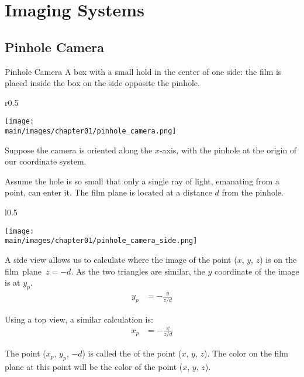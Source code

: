 \documentclass[../COS3712_Notes.tex]{subfiles}
\begin{document}
    \section{Imaging Systems}
      \subsection{Pinhole Camera}
        \begin{definition}{Pinhole Camera}
          A box with a small hold in the center of one side:
          the film is placed inside the box on the side opposite the pinhole.
        \end{definition}
        \begin{example}
          \begin{wrapfigure}[7]{r}{0.5\textwidth}
            \begin{center}
              \texttt{[image: \\main/images/chapter01/pinhole\_camera.png]}
            \end{center}
            \caption{Pinhole Camera}
          \end{wrapfigure}

          Suppose the camera is oriented along the \mbox{$x$-axis},
          with the pinhole at the origin of our coordinate system.

          Assume the hole is so small that only a single ray of light,
          emanating from a point, can enter it.
          The film plane is located at a distance $d$ from the pinhole.

          \vspace{7em}
          \pagebreak

          \begin{wrapfigure}[11]{l}{0.5\textwidth}
            \vspace{-20pt}
            \begin{center}
              \texttt{[image: \\main/images/chapter01/pinhole\_camera\_side.png]}
            \end{center}
            \vspace{-10pt}
            \caption{Pinhole Camera Side View}
          \end{wrapfigure}

          A side view allows us to calculate where the image of the point ($x$, $y$, $z$) is
          on the film~plane~$z = -d$.
          As the two triangles are similar, the $y$ coordinate of the image is at $y_p$.
          \begin{align*}
            y_p &= -\frac{y}{z/d}
          \end{align*}

          Using a top view, a similar calculation is:
          \begin{align*}
            x_p &= -\frac{x}{z/d}
          \end{align*}

          The point ($x_p$, $y_p$, $-d$) is called the 
          of the point ($x$, $y$, $z$).
          The color on the film plane at this point will be the color of the point ($x$, $y$, $z$).
        \end{example}
\end{document}
